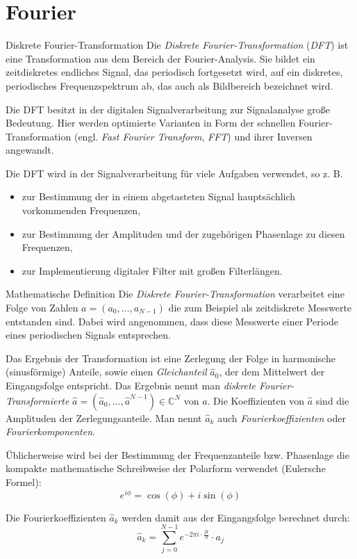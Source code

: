 \section{Fourier}

\begin{defi}{Diskrete Fourier-Transformation}
    Die \emph{Diskrete Fourier-Transformation} (\emph{DFT}) ist eine Transformation aus dem Bereich der Fourier-Analysis.
    Sie bildet ein zeitdiskretes endliches Signal, das periodisch fortgesetzt wird, auf ein diskretes, periodisches Frequenzspektrum ab, das auch als Bildbereich bezeichnet wird.

    Die DFT besitzt in der digitalen Signalverarbeitung zur Signalanalyse große Bedeutung.
    Hier werden optimierte Varianten in Form der schnellen Fourier-Transformation (engl. \emph{Fast Fourier Transform}, \emph{FFT}) und ihrer Inversen angewandt.

    Die DFT wird in der Signalverarbeitung für viele Aufgaben verwendet, so z. B.
    \begin{itemize}
        \item zur Bestimmung der in einem abgetasteten Signal hauptsächlich vorkommenden Frequenzen,
        \item zur Bestimmung der Amplituden und der zugehörigen Phasenlage zu diesen Frequenzen,
        \item zur Implementierung digitaler Filter mit großen Filterlängen.
    \end{itemize}
\end{defi}

\begin{defi}{Mathematische Definition}
    Die \emph{Diskrete Fourier-Transformation} verarbeitet eine Folge von Zahlen $a = (a_0, \ldots, a_{N-1})$ die zum Beispiel als zeitdiskrete Messwerte entstanden sind. Dabei wird angenommen, dass diese Messwerte einer Periode eines periodischen Signals entsprechen.

    Das Ergebnis der Transformation ist eine Zerlegung der Folge in harmonische (sinusförmige) Anteile, sowie einen \emph{Gleichanteil} $\hat{a}_0$, der dem Mittelwert der Eingangsfolge entspricht.
    Das Ergebnis nennt man \emph{diskrete Fourier-Transformierte} $\hat{a} = ( \hat{a}_0, \ldots, \hat{a}^{N-1} ) \in \mathbb{C}^N$ von $a$.
    Die Koeffizienten von $\hat{a}$ sind die Amplituden der Zerlegungsanteile.
    Man nennt $\hat{a}_k$ auch \emph{Fourierkoeffizienten} oder \emph{Fourierkomponenten}.

    Üblicherweise wird bei der Bestimmung der Frequenzanteile bzw. Phasenlage die kompakte mathematische Schreibweise der Polarform verwendet (Eulersche Formel):
    \[
        e^{i\phi} = \cos(\phi) + i \sin(\phi)
    \]

    Die Fourierkoeffizienten $\hat{a}_{k}$ werden damit aus der Eingangsfolge berechnet durch:
    \[
        \hat{a}_{k} = \sum _{j=0}^{N-1} e^{-2\pi i \cdot \frac {jk}{N}} \cdot a_{j}
    \]
\end{defi}
